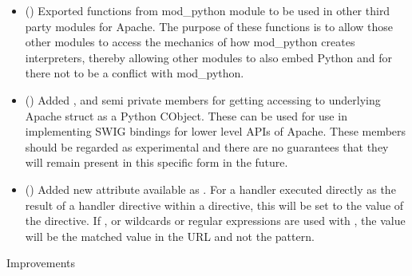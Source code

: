 \begin{itemize}
    \item
      ()
      Exported functions from mod_python module to be used in other third
      party modules for Apache. The purpose of these functions is to allow
      those other modules to access the mechanics of how mod_python creates
      interpreters, thereby allowing other modules to also embed Python
      and for there not to be a conflict with mod_python.
    \item
      ()
      Added ,  and
       semi private members for getting accessing to
      underlying Apache struct as a Python CObject. These can be used for
      use in implementing SWIG bindings for lower level APIs of Apache.
      These members should be regarded as experimental and there are no
      guarantees that they will remain present in this specific form in the
      future.
    \item
      ()
      Added new attribute available as . For a
      handler executed directly as the result of a handler directive
      within a  directive, this will be set to the value
      of the  directive. If , or
      wildcards or regular expressions are used with ,
      the value will be the matched value in the URL and not the pattern.
  \end{itemize}

  Improvements
  
